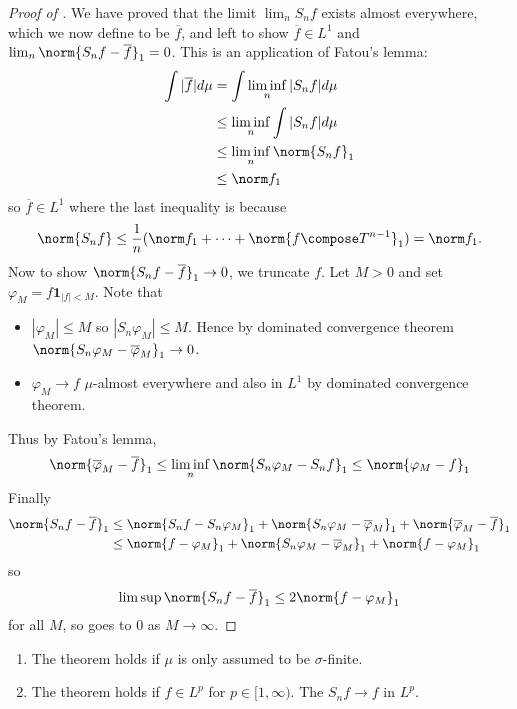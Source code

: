 \documentclass[a4paper]{article}
\begin{document}
\begin{proof}[Proof of ]
  We have proved that the limit \(\lim_n S_nf\) exists almost everywhere, which we now define to be \(\overline f\), and left to show \(\overline f \in L^1\) and \(\lim_n \norm{S_nf - \overline f}_1 = 0\). This is an application of Fatou's lemma:
  \begin{align*}
    \int |\overline f| d\mu
    &= \int \liminf_n |S_n f| d\mu \\
    &\leq \liminf_n \int |S_n f| d\mu \\
    &\leq \liminf_n \norm{S_n f}_1 \\
    &\leq \norm f_1
  \end{align*}
  so \(\overline f \in L^1\) where the last inequality is because
  \[
    \norm{S_nf} \leq \frac{1}{n}(\norm f_1 + \dots + \norm{f \compose T^{n - 1}}_1) = \norm f_1.
  \]
  Now to show \(\norm{S_n f - \overline f}_1 \to 0\), we truncate \(f\). Let \(M > 0\) and set \(\varphi_M = f \mathbf 1_{|f| < M}\). Note that
  \begin{itemize}
  \item \(|\varphi_M| \leq M\) so \(|S_n \varphi_M| \leq M\). Hence by dominated convergence theorem \(\norm{S_n \varphi_M - \overline\varphi_M}_1 \to 0\).
  \item \(\varphi_M \to f\) \(\mu\)-almost everywhere and also in \(L^1\) by dominated convergence theorem.
  \end{itemize}
  Thus by Fatou's lemma,
  \[
    \norm{\overline \varphi_M - \overline f}_1
    \leq \liminf_n \norm{S_n \varphi_M - S_n f}_1
    \leq \norm{\varphi_M - f}_1
  \]
  Finally
  \begin{align*}
    \norm{S_nf - \overline f}_1
    &\leq \norm{S_n f - S_n \varphi_M}_1 + \norm{S_n \varphi_M - \overline \varphi_M}_1 + \norm{\overline \varphi_M - \overline f}_1 \\
    &\leq \norm{f - \varphi_M}_1 + \norm{S_n \varphi_M - \overline \varphi_M}_1 + \norm{f - \varphi_M}_1
  \end{align*}
  so
  \[
    \limsup \norm{S_nf - \overline f}_1 \leq 2 \norm{f - \varphi_M}_1
  \]
  for all \(M\), so goes to \(0\) as \(M \to \infty\).
\end{proof}

\begin{remark}\leavevmode
  \begin{enumerate}
  \item The theorem holds if \(\mu\) is only assumed to be \(\sigma\)-finite.
  \item The theorem holds if \(f \in L^p\) for \(p \in [1, \infty)\). The \(S_nf \to f\) in \(L^p\).
  \end{enumerate}
\end{remark}

\printindex
\end{document}
